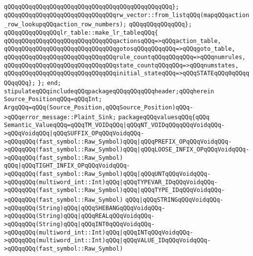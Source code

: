 \verb|qQQqqQQqqQQqqQQqqQQqqQQqqQQqqQQqqQQqqQQqqQQqqQQq};|\newline
\newline
\verb|qQQqqQQqqQQqqQQqqQQqqQQqqQQqqQQqrw_vector::from_listqQQq(mapqQQqaction_row_lookupqQQqaction_row_numbers);|\newline
\verb|qQQqqQQqqQQqqQQq};|\newline
\newline
\verb|qQQqqQQqqQQqqQQqlr_table::make_lr_tableqQQq{|\newline
\verb|qQQqqQQqqQQqqQQqqQQqqQQqqQQqqQQqactionsqQQq=>qQQqaction_table,|\newline
\verb|qQQqqQQqqQQqqQQqqQQqqQQqqQQqqQQqgotosqQQqqQQqqQQq=>qQQqgoto_table,|\newline
\verb|qQQqqQQqqQQqqQQqqQQqqQQqqQQqqQQqrule_countqQQqqQQqqQQq=>qQQqnumrules,|\newline
\verb|qQQqqQQqqQQqqQQqqQQqqQQqqQQqqQQqstate_countqQQqqQQq=>qQQqnumstates,|\newline
\verb|qQQqqQQqqQQqqQQqqQQqqQQqqQQqqQQqinitial_stateqQQq=>qQQqSTATEqQQq0qQQqqQQqqQQq};|\newline
\verb|};|\newline
\verb|end;|\newline
\verb|stipulateqQQqincludeqQQqpackageqQQqqQQqqQQqheader;qQQqherein|\newline
\verb|Source_PositionqQQq=qQQqInt;|\newline
\verb|ArgqQQq=qQQq(Source_Position,qQQqSource_Position)qQQq->qQQqerror_message::Plaint_Sink;|\newline
\verb|packageqQQqvaluesqQQq{qQQq|\newline
\verb|Semantic_ValueqQQq=qQQqTM_VOIDqQQq|\verb#|qQQqNT_VOIDqQQqqQQqVoidqQQq->qQQqVoidqQQq|qQQqSUFFIX_OPqQQqVoidqQQq->qQQqqQQq(fast_symbol::Raw_Symbol)qQQq|qQQqPREFIX_OPqQQqVoidqQQq->qQQqqQQq(fast_symbol::Raw_Symbol)qQQq|qQQqLOOSE_INFIX_OPqQQqVoidqQQq->qQQqqQQq(fast_symbol::Raw_Symbol)#\newline
\verb|qQQq|\verb#|qQQqTIGHT_INFIX_OPqQQqVoidqQQq->qQQqqQQq(fast_symbol::Raw_Symbol)qQQq|qQQqUNTqQQqVoidqQQq->qQQqqQQq(multiword_int::Int)qQQq|qQQqTYPEVAR_IDqQQqVoidqQQq->qQQqqQQq(fast_symbol::Raw_Symbol)qQQq|qQQqTYPE_IDqQQqVoidqQQq->qQQqqQQq(fast_symbol::Raw_Symbol)#\newline
\verb|qQQq|\verb#|qQQqSTRINGqQQqVoidqQQq->qQQqqQQq(String)qQQq|qQQqSHEBANGqQQqVoidqQQq->qQQqqQQq(String)qQQq|qQQqREALqQQqVoidqQQq->qQQqqQQq(String)qQQq|qQQqINT0qQQqVoidqQQq->qQQqqQQq(multiword_int::Int)qQQq|qQQqINTqQQqVoidqQQq->qQQqqQQq(multiword_int::Int)qQQq|qQQqVALUE_IDqQQqVoidqQQq->qQQqqQQq(fast_symbol::Raw_Symbol)#\newline
